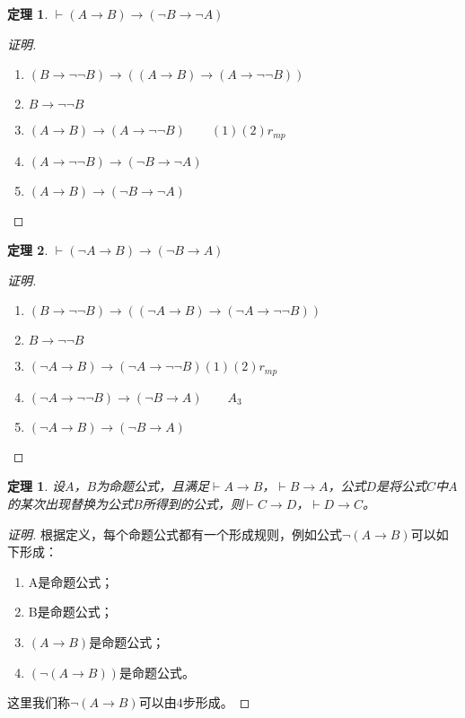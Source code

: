 \documentclass{article}
\newtheorem{Thm}{定理}
\newtheorem*{thm}{定理}
\begin{document}
\begin{CJK*}{UTF8}{gbsn}
  \begin{Thm}$\vdash (A\to B)\to (\lnot B\to \lnot A)$\end{Thm}
  \begin{proof}[证明]$\quad$
    \begin{enumerate}
      \item $(B\to \lnot\lnot B)\to ((A\to B)\to (A\to \lnot\lnot B))$
      \item $B\to \lnot\lnot B$
      \item $(A\to B)\to (A\to \lnot\lnot B)\qquad (1)(2)r_{mp}$
      \item $(A\to \lnot\lnot B)\to (\lnot B\to \lnot A)$
      \item $(A\to B)\to (\lnot B\to \lnot A)$
    \end{enumerate}
  \end{proof}

  \begin{Thm}$\vdash (\lnot A \to B)\to (\lnot B\to A)$\end{Thm}
  \begin{proof}[证明]$\quad$
    \begin{enumerate}
      \item $(B\to \lnot\lnot B)\to ((\lnot A\to B)\to (\lnot A\to \lnot\lnot B))$
      \item $B\to \lnot\lnot B$
      \item $(\lnot A\to B)\to (\lnot A\to \lnot\lnot B) (1)(2)r_{mp}$
      \item $(\lnot A\to \lnot\lnot B)\to (\lnot B\to A)\qquad A_3$
      \item $(\lnot A \to B)\to (\lnot B\to A)$
    \end{enumerate}
  \end{proof}

  \begin{thm}
    设$A$，$B$为命题公式，且满足$\vdash A\to B$，$\vdash B\to A$，公式$D$是将公式$C$中$A$的某次出现替换为公式$B$所得到的公式，则$\vdash C\to D$，$\vdash D\to C$。
  \end{thm}
  \begin{proof}[证明]
    根据定义，每个命题公式都有一个形成规则，例如公式$\lnot(A\to B)$可以如下形成：
    \begin{enumerate}
      \item A是命题公式；
      \item B是命题公式；
      \item $(A\to B)$是命题公式；
      \item $(\lnot(A\to B))$是命题公式。
    \end{enumerate}
    这里我们称$\lnot(A\to B)$可以由$4$步形成。


\end{proof}
\end{CJK*}
\end{document}
